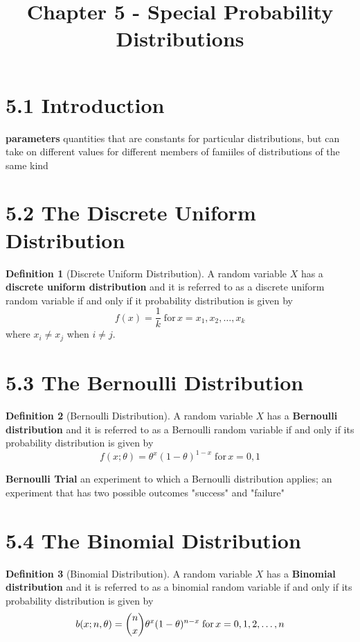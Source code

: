 \documentclass[
10pt,reqno
]{amsart}
\title{Chapter 5 - Special Probability Distributions}
\theoremstyle{definition}
\newtheorem{definition}{Definition}[section]
\begin{document}
\maketitle


\section*{5.1 Introduction}

\textbf{parameters} quantities that are constants for particular distributions, but can take on different values for different members of famiiles of distributions of the same kind

\section*{5.2 The Discrete Uniform Distribution}

\begin{definition}[Discrete Uniform Distribution]
A random variable \(X\) has a \textbf{discrete uniform distribution} and it is referred to as a discrete uniform random variable if and only if it probability distribution is given by
\[
f(x) = \frac{1}{k} \; \text{for} \, x = x_1, x_2, \dots, x_k
\]
where \(x_i \ne x_j\) when \(i \ne j\).
\end{definition}

\section*{5.3 The Bernoulli Distribution}

\begin{definition}[Bernoulli Distribution]
A random variable \(X\) has a \textbf{Bernoulli distribution} and it is referred to as a Bernoulli random variable if and only if its probability distribution is given by
\[
f(x; \theta) = \theta ^x (1-\theta)^{1-x} \; \text{for} \, x=0,1
\]
\end{definition}

\textbf{Bernoulli Trial} an experiment to which a Bernoulli distribution applies; an experiment that has two possible outcomes "success" and "failure"

\section*{5.4 The Binomial Distribution}

\begin{definition}[Binomial Distribution]
\label{dfn:BinomialDistribution}
A random variable \(X\) has a \textbf{Binomial distribution} and it is referred to as a binomial random variable if and only if its probability distribution is given by
\[
b(x; n, \theta)= \dbinom n x \theta^x (1-\theta)^{n-x} \; \text{for} \, x=0,1,2,\dots,n
\]
\end{definition}
\end{document}
